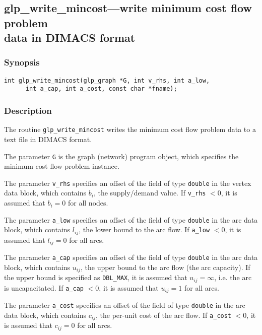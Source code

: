 \documentclass[dvipdfm,11pt]{report}
\begin{document}
\newpage

\subsection{glp\_write\_mincost---write minimum cost flow problem\\data
in DIMACS format}

\subsubsection*{Synopsis}

\begin{verbatim}
int glp_write_mincost(glp_graph *G, int v_rhs, int a_low,
      int a_cap, int a_cost, const char *fname);
\end{verbatim}

\subsubsection*{Description}

The routine \verb|glp_write_mincost| writes the minimum cost flow
problem data to a text file in DIMACS format.

The parameter \verb|G| is the graph (network) program object, which
specifies the minimum cost flow problem instance.

The parameter \verb|v_rhs| specifies an offset of the field of type
\verb|double| in the vertex data block, which contains $b_i$, the
supply/demand value. If \verb|v_rhs| $<0$, it is assumed that $b_i=0$
for all nodes.

The parameter \verb|a_low| specifies an offset of the field of type
\verb|double| in the arc data block, which contains $l_{ij}$, the lower
bound to the arc flow. If \verb|a_low| $<0$, it is assumed that
$l_{ij}=0$ for all arcs.

The parameter \verb|a_cap| specifies an offset of the field of type
\verb|double| in the arc data block, which contains $u_{ij}$, the upper
bound to the arc flow (the arc capacity). If the upper bound is
specified as \verb|DBL_MAX|, it is assumed that $u_{ij}=\infty$, i.e.
the arc is uncapacitated. If \verb|a_cap| $<0$, it is assumed that
$u_{ij}=1$ for all arcs.

The parameter \verb|a_cost| specifies an offset of the field of type
\verb|double| in the arc data block, which contains $c_{ij}$, the
per-unit cost of the arc flow. If \verb|a_cost| $<0$, it is assumed that
$c_{ij}=0$ for all arcs.
\end{document}
